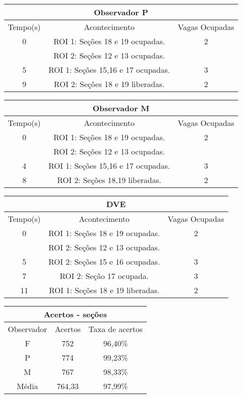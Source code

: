 \begin{center}
\begin{tabular}{|c||c||c|}
\hline
\multicolumn{3}{|c|}{Observador P}  \\ \hline \hline
Tempo(s) & Acontecimento & Vagas Ocupadas \\ \hline
0 & ROI 1: Seções 18 e 19 ocupadas. & 2 \\
 & ROI 2: Seções 12 e 13 ocupadas. &  \\ \hline
5 & ROI 1: Seções 15,16 e 17 ocupadas. & 3 \\ \hline
9 & ROI 2: Seções 18 e 19 liberadas. & 2 \\
\hline
\end{tabular}
\end{center}

\begin{center}
\begin{tabular}{|c||c||c|}
\hline
\multicolumn{3}{|c|}{Observador M}  \\ \hline \hline
Tempo(s) & Acontecimento & Vagas Ocupadas \\ \hline
0 & ROI 1: Seções 18 e 19 ocupadas. & 2 \\
 & ROI 2: Seções 12 e 13 ocupadas. &  \\ \hline
4 & ROI 1: Seções 15,16 e 17 ocupadas. & 3 \\ \hline
8 & ROI 2: Seções 18,19 liberadas. & 2\\
\hline
\end{tabular}
\end{center}

\begin{center}
\begin{tabular}{|c||c||c|}
\hline
\multicolumn{3}{|c|}{DVE}  \\ \hline \hline
Tempo(s) & Acontecimento & Vagas Ocupadas \\ \hline
0 & ROI 1: Seções 18 e 19 ocupadas. & 2 \\
 & ROI 2: Seções 12 e 13 ocupadas. &  \\ \hline
5 & ROI 2: Seções 15 e 16 ocupadas. & 3 \\ \hline
7 & ROI 2: Seção 17 ocupada. & 3 \\ \hline
11 & ROI 1: Seções 18 e 19 liberadas. & 2 \\
\hline
\end{tabular}
\end{center}

\begin{center}
\begin{tabular}{|c||c||c|}
\hline
\multicolumn{3}{|c|}{Acertos - seções}  \\ \hline
Observador & Acertos & Taxa de acertos \\ \hline
F & 752 & 96,40\% \\  \hline
P & 774 & 99,23\% \\ \hline
M & 767 & 98,33\% \\ \hline
Média & 764,33 & 97,99\% \\
\hline
\end{tabular}
\end{center}


